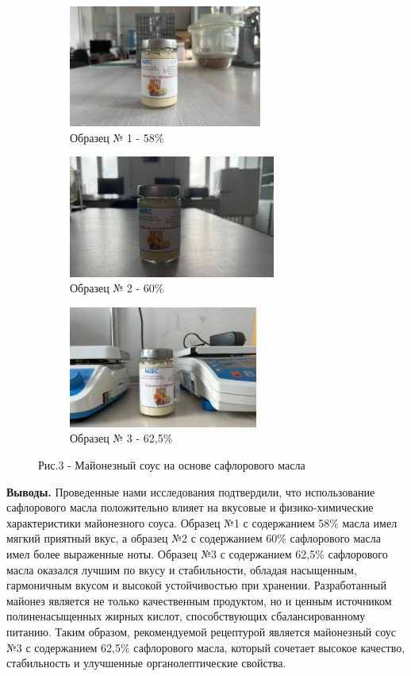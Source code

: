 \begin{figure}[H]
    \centering
    \begin{subfigure}[t]{0.3\textwidth}
        \centering
        \includegraphics[width=\textwidth, height=4cm]{media/pish2/image70}
        \caption*{Образец № 1 - 58\%}
    \end{subfigure}
    \begin{subfigure}[t]{0.3\textwidth}
        \centering
        \includegraphics[width=\textwidth, height=4cm]{media/pish2/image71}
        \caption*{Образец № 2 - 60\%}
    \end{subfigure}
    \begin{subfigure}[t]{0.3\textwidth}
        \centering
        \includegraphics[width=\textwidth, height=4cm]{media/pish2/image72}
        \caption*{Образец № 3 - 62,5\%}
    \end{subfigure}
    \caption*{Рис.3 - Майонезный соус на основе сафлорового масла}
\end{figure}

\begin{multicols}{2}
{\bfseries Выводы.} Проведенные нами исследования подтвердили, что
использование сафлорового масла положительно влияет на вкусовые и
физико-химические характеристики майонезного соуса. Образец №1 с
содержанием 58\% масла имел мягкий приятный вкус, а образец №2 с
содержанием 60\% сафлорового масла имел более выраженные ноты. Образец
№3 с содержанием 62,5\% сафлорового масла оказался лучшим по вкусу и
стабильности, обладая насыщенным, гармоничным вкусом и высокой
устойчивостью при хранении. Разработанный майонез является не только
качественным продуктом, но и ценным источником полиненасыщенных жирных
кислот, способствующих сбалансированному питанию. Таким образом,
рекомендуемой рецептурой является майонезный соус №3 с содержанием
62,5\% сафлорового масла, который сочетает высокое качество,
стабильность и улучшенные органолептические свойства.
\end{multicols}

